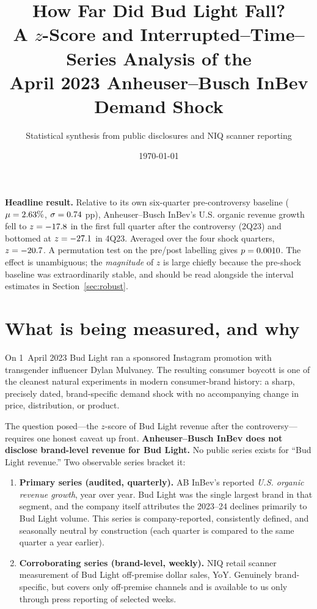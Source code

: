 \documentclass[11pt,a4paper]{article}
\title{\vspace{-1.4cm}\bfseries How Far Did Bud Light Fall?\\[2pt]
\large\mdseries A $z$-Score and Interrupted--Time--Series Analysis of the\\
April 2023 Anheuser--Busch InBev Demand Shock}
\author{\normalsize Statistical synthesis from public disclosures and NIQ scanner reporting}
\date{\normalsize\today}
\begin{document}
\maketitle
\thispagestyle{fancy}

\begin{keybox}
\textbf{Headline result.} Relative to its own six-quarter pre-controversy baseline
($\mu = 2.63\%$, $\sigma = 0.74$ pp), Anheuser--Busch InBev's U.S. organic
revenue growth fell to $z = -17.8$ in the first full quarter after the
controversy (2Q23) and bottomed at $z = -27.1$ in 4Q23. Averaged over the four
shock quarters, $z = -20.7$. A permutation test on the pre/post labelling
gives $p = 0.0010$. The effect is unambiguous; the \emph{magnitude} of $z$ is
large chiefly because the pre-shock baseline was extraordinarily stable, and
should be read alongside the interval estimates in Section~\ref{sec:robust}.
\end{keybox}

\section{What is being measured, and why}

On 1~April 2023 Bud Light ran a sponsored Instagram promotion with transgender
influencer Dylan Mulvaney. The resulting consumer boycott is one of the
cleanest natural experiments in modern consumer-brand history: a sharp,
precisely dated, brand-specific demand shock with no accompanying change in
price, distribution, or product.

The question posed---the $z$-score of Bud Light revenue after the
controversy---requires one honest caveat up front. \textbf{Anheuser--Busch InBev
does not disclose brand-level revenue for Bud Light.} No public series exists
for ``Bud Light revenue.'' Two observable series bracket it:

\begin{enumerate}[leftmargin=1.4em,itemsep=2pt]
\item \textbf{Primary series (audited, quarterly).} AB InBev's reported
  \emph{U.S. organic revenue growth}, year over year. Bud Light was the
  single largest brand in that segment, and the company itself attributes the
  2023--24 declines primarily to Bud Light volume. This series is
  company-reported, consistently defined, and seasonally neutral by
  construction (each quarter is compared to the same quarter a year earlier).
\item \textbf{Corroborating series (brand-level, weekly).} NIQ retail scanner
  measurement of Bud Light off-premise dollar sales, YoY. Genuinely
  brand-specific, but covers only off-premise channels and is available to us
  only through press reporting of selected weeks.
\end{enumerate}
\end{document}
